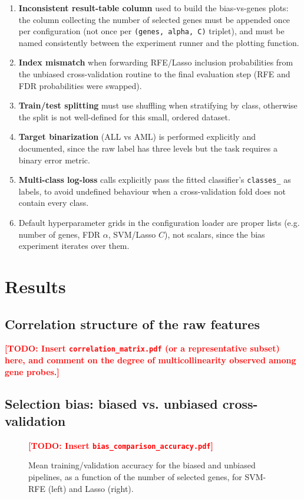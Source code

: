 \documentclass[11pt,a4paper]{article}
\newcommand{\todo}[1]{\textcolor{red}{\textbf{[TODO: #1]}}}
\begin{document}
\begin{enumerate}
    \item \textbf{Inconsistent result-table column} used to build the bias-vs-genes plots: the column collecting the number of selected genes must be appended once per configuration (not once per \texttt{(genes, alpha, C)} triplet), and must be named consistently between the experiment runner and the plotting function.
    \item \textbf{Index mismatch} when forwarding RFE/Lasso inclusion probabilities from the unbiased cross-validation routine to the final evaluation step (RFE and FDR probabilities were swapped).
    \item \textbf{Train/test splitting} must use shuffling when stratifying by class, otherwise the split is not well-defined for this small, ordered dataset.
    \item \textbf{Target binarization} (ALL vs AML) is performed explicitly and documented, since the raw label has three levels but the task requires a binary error metric.
    \item \textbf{Multi-class log-loss} calls explicitly pass the fitted classifier's \texttt{classes\_} as labels, to avoid undefined behaviour when a cross-validation fold does not contain every class.
    \item Default hyperparameter grids in the configuration loader are proper lists (e.g. number of genes, FDR $\alpha$, SVM/Lasso $C$), not scalars, since the bias experiment iterates over them.
\end{enumerate}

\section{Results}

\subsection{Correlation structure of the raw features}
\todo{Insert \texttt{correlation\_matrix.pdf} (or a representative subset)
here, and comment on the degree of multicollinearity observed among gene
probes.}

\subsection{Selection bias: biased vs. unbiased cross-validation}
\begin{figure}[h!]
    \centering
    \todo{Insert \texttt{bias\_comparison\_accuracy.pdf}}
    \caption{Mean training/validation accuracy for the biased and unbiased
    pipelines, as a function of the number of selected genes, for SVM-RFE
    (left) and Lasso (right).}
    \label{fig:bias-acc}
\end{figure}
\end{document}
